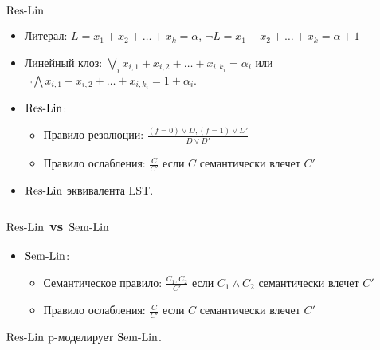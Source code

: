 \begin{frame}
    \frametitle{$\mathrm{Res\mbox{-}Lin}$}

    \begin{itemize}
		\item Литерал: $L = x_{1} + x_{2} + \dots + x_{k} = \alpha$,
    		$\lnot L = x_{1} + x_{2} + \dots + x_{k} = \alpha + 1$
		\item Линейный клоз: $\bigvee_i x_{i, 1} + x_{i, 2} + \dots + x_{i, k_i} =
		    \alpha_i$ или $\lnot \bigwedge x_{i, 1} + x_{i, 2} + \dots + x_{i, k_i} =
            1 + \alpha_i$.
        \pause
		\item $\mathrm{Res\mbox{-}Lin}$:
			\begin{itemize}
				\item Правило резолюции: $\frac{(f = 0) \lor D, (f = 1) \lor D'}
            		{D \lor D'}$ 
				\item Правило ослабления: $\frac{C}{C'}$ если $C$ семантически влечет $C'$
			\end{itemize}
        \pause
		\item {} $\mathrm{Res\mbox{-}Lin}$ эквивалента LST.
	\end{itemize}
	\scalebox{0.8}{}
\end{frame}



\begin{frame}
    \frametitle{$\mathrm{Res\mbox{-}Lin}$ vs $\mathrm{Sem\mbox{-}Lin}$}

    \begin{itemize}
		\item $\mathrm{Sem\mbox{-}Lin}$:
			\begin{itemize}
				\item Семантическое правило: $\frac{C_1, C_2}{C'}$ если $C_1 \land C_2$
		            семантически влечет $C'$
				\item Правило ослабления: $\frac{C}{C'}$ если $C$ семантически влечет $C'$
			\end{itemize}
	\end{itemize}

	\pause
    \begin{theorem}
        $\mathrm{Res\mbox{-}Lin}$ p-моделирует $\mathrm{Sem\mbox{-}Lin}$.
    \end{theorem}
\end{frame}

